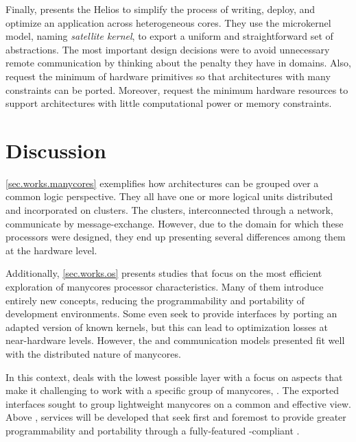 	Finally,  presents the Helios \os to
	simplify the process of writing, deploy, and optimize an application across
	heterogeneous cores.
	They use the microkernel model, naming \textit{satellite kernel}, to export
	a uniform and straightforward set of \os abstractions.
	The most important design decisions were to avoid unnecessary remote communication
	by thinking about the penalty they have in \numa domains.
	Also, request the minimum of hardware primitives so that architectures with many
	constraints can be ported.
	Moreover, request the minimum hardware resources to support architectures with little
	computational power or memory constraints.

\section{Discussion}

	\autoref{sec.works.manycores} exemplifies how \manycore architectures can be
	grouped over a common logic perspective.
	They all have one or more logical units distributed and incorporated on clusters.
	The clusters, interconnected through a network, communicate by message-exchange.
	However, due to the domain for which these processors were designed, they end up
	presenting several differences among them at the hardware level.

	Additionally, \autoref{sec.works.os} presents \oss studies that focus
	on the most efficient exploration of manycores processor characteristics.
	Many of them introduce entirely new concepts, reducing the programmability
	and portability of development environments. Some even seek to provide
	\posix interfaces by porting an adapted version of known kernels, but
	this can lead to optimization losses at near-hardware levels.
	However, the \os and communication models presented fit well with the
	distributed nature of manycores.

	In this context, \nanvix \hal deals with the lowest possible layer
	with a focus on aspects that make it challenging to work with a
	specific group of manycores, \ie \lightweight \manycores. The exported
	interfaces sought to group lightweight manycores on a common and effective
	view. Above \hal, services will be developed that seek first and foremost
	to provide greater programmability and portability through a fully-featured
	\posix-compliant \os.
